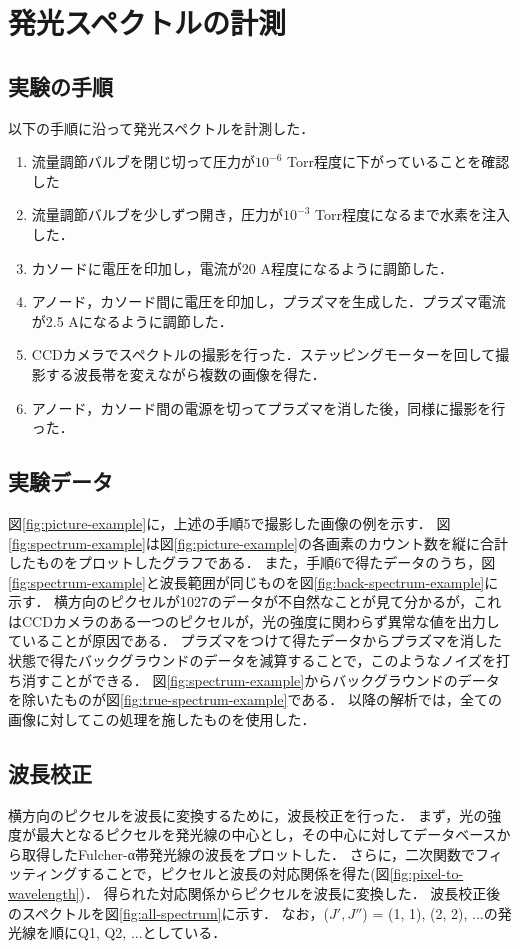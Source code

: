 \chapter{発光スペクトルの計測}
\section{実験の手順}
以下の手順に沿って発光スペクトルを計測した．
\begin{enumerate}
    \item 流量調節バルブを閉じ切って圧力が$10^{-6}$ Torr程度に下がっていることを確認した
    \item 流量調節バルブを少しずつ開き，圧力が$10^{-3}$ Torr程度になるまで水素を注入した．
    \item カソードに電圧を印加し，電流が20 A程度になるように調節した．
    \item アノード，カソード間に電圧を印加し，プラズマを生成した．プラズマ電流が2.5 Aになるように調節した．
    \item CCDカメラでスペクトルの撮影を行った．ステッピングモーターを回して撮影する波長帯を変えながら複数の画像を得た．
    \item アノード，カソード間の電源を切ってプラズマを消した後，同様に撮影を行った．
\end{enumerate}

\section{実験データ}
図\ref{fig:picture-example}に，上述の手順5で撮影した画像の例を示す．
図\ref{fig:spectrum-example}は図\ref{fig:picture-example}の各画素のカウント数を縦に合計したものをプロットしたグラフである．
また，手順6で得たデータのうち，図\ref{fig:spectrum-example}と波長範囲が同じものを図\ref{fig:back-spectrum-example}に示す．
横方向のピクセルが1027のデータが不自然なことが見て分かるが，これはCCDカメラのある一つのピクセルが，光の強度に関わらず異常な値を出力していることが原因である．
プラズマをつけて得たデータからプラズマを消した状態で得たバックグラウンドのデータを減算することで，このようなノイズを打ち消すことができる．
図\ref{fig:spectrum-example}からバックグラウンドのデータを除いたものが図\ref{fig:true-spectrum-example}である．
以降の解析では，全ての画像に対してこの処理を施したものを使用した．

\section{波長校正}
横方向のピクセルを波長に変換するために，波長校正を行った．
まず，光の強度が最大となるピクセルを発光線の中心とし，その中心に対してデータベース\cite{H2-spectrum-data}から取得したFulcher-α帯発光線の波長をプロットした．
さらに，二次関数でフィッティングすることで，ピクセルと波長の対応関係を得た(図\ref{fig:pixel-to-wavelength})．
得られた対応関係からピクセルを波長に変換した．
波長校正後のスペクトルを図\ref{fig:all-spectrum}に示す．
なお，($J', J''$) = (1, 1), (2, 2), ...の発光線を順にQ1, Q2, ...としている．